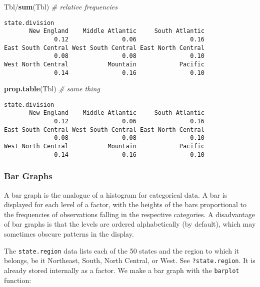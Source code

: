 \documentclass[]{book}
\newenvironment{Shaded}{\begin{snugshade}}{\end{snugshade}}
\newcommand{\KeywordTok}[1]{\textcolor[rgb]{0.13,0.29,0.53}{\textbf{{#1}}}}
\newcommand{\CommentTok}[1]{\textcolor[rgb]{0.56,0.35,0.01}{\textit{{#1}}}}
\newcommand{\NormalTok}[1]{{#1}}
\numberwithin{equation}{chapter}
\numberwithin{figure}{chapter}
\theoremstyle{plain}
\theoremstyle{definition}
\theoremstyle{remark}
\theoremstyle{definition}
\theoremstyle{definition}
\theoremstyle{remark}
\let\BeginKnitrBlock\begin \let\EndKnitrBlock\end
\begin{document}
\begin{Shaded}
\begin{Highlighting}[]
\NormalTok{Tbl/}\KeywordTok{sum}\NormalTok{(Tbl)      }\CommentTok{# relative frequencies}
\end{Highlighting}
\end{Shaded}

\begin{verbatim}
state.division
       New England    Middle Atlantic     South Atlantic 
              0.12               0.06               0.16 
East South Central West South Central East North Central 
              0.08               0.08               0.10 
West North Central           Mountain            Pacific 
              0.14               0.16               0.10 
\end{verbatim}

\begin{Shaded}
\begin{Highlighting}[]
\KeywordTok{prop.table}\NormalTok{(Tbl)   }\CommentTok{# same thing}
\end{Highlighting}
\end{Shaded}

\begin{verbatim}
state.division
       New England    Middle Atlantic     South Atlantic 
              0.12               0.06               0.16 
East South Central West South Central East North Central 
              0.08               0.08               0.10 
West North Central           Mountain            Pacific 
              0.14               0.16               0.10 
\end{verbatim}

\subsubsection{Bar Graphs}\label{par-bar-graphs}

A bar graph is the analogue of a histogram for categorical data. A bar
is displayed for each level of a factor, with the heights of the bars
proportional to the frequencies of observations falling in the
respective categories. A disadvantage of bar graphs is that the levels
are ordered alphabetically (by default), which may sometimes obscure
patterns in the display.

\bigskip

\BeginKnitrBlock{example}[U.S. State Facts and Features]
\protect\hypertarget{ex:unnamed-chunk-47}{}{\label{ex:unnamed-chunk-47}
\iffalse (U.S. State Facts and Features) \fi }The \texttt{state.region}
data lists each of the 50 states and the region to which it belongs, be
it Northeast, South, North Central, or West. See \texttt{?state.region}.
It is already stored internally as a factor. We make a bar graph with
the \texttt{barplot}  function:
\EndKnitrBlock{example}
\end{document}
